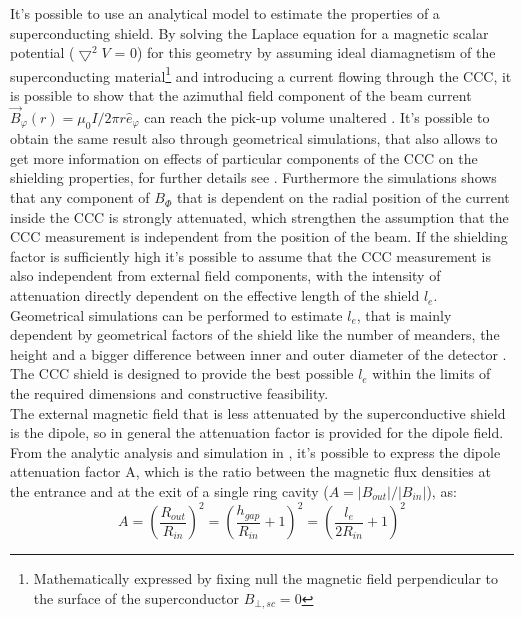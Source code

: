 \documentclass[12pt,a4paper]{report}
\begin{document}
	    It's possible to use an analytical model to estimate the properties of a superconducting shield. By solving the Laplace equation for a magnetic scalar potential ($\bigtriangledown^2V$ = 0) for this geometry by assuming ideal diamagnetism of the superconducting material\footnote{Mathematically expressed by fixing null the magnetic field perpendicular to the surface of the superconductor $B_{\bot,sc} = 0$} and introducing a current flowing through the CCC, it is possible to show that the azimuthal field component of the beam current $\overrightarrow{B}_\varphi(r)= \mu_0I/2\pi r\hat{e}_\varphi$ can reach the pick-up volume unaltered \cite{GROHMANN_CCC} \cite{GROHMANN_shield}. It's possible to obtain the same result also through geometrical simulations, that also allows to get more information on effects of particular components of the CCC on the shielding properties, for further details see \cite{DEGERSEM_shield}.
        Furthermore the simulations shows that any component of $B_\Phi$ that is dependent on the radial position of the current inside the CCC is strongly attenuated, which strengthen the assumption that the CCC measurement is independent from the position of the beam. If the shielding factor is sufficiently high it's possible to assume that the CCC measurement is also independent from external field components, with the intensity of attenuation directly dependent on the effective length of the shield $l_e$. Geometrical simulations can be performed to estimate $l_e$, that is mainly dependent by geometrical factors of the shield like the number of meanders, the height and a bigger difference between inner and outer diameter of the detector \cite{DEGERSEM_shield} \cite{Marsic_shield}. The CCC shield is designed to provide the best possible \( l_e \) within the limits of the required dimensions and constructive feasibility.\\
        The external magnetic field that is less attenuated by the superconductive shield is the dipole, so in general the attenuation factor is provided for the dipole field. From the analytic analysis and simulation in \cite{GROHMANN_shield} \cite{DEGERSEM_shield}, it's possible to express the dipole attenuation factor A, which is the ratio between the magnetic flux densities at the entrance and at the exit of a single ring cavity ($A= |B_{out}|/|B_{in}|$), as:
        \begin{equation}
        	A = \left(\frac{R_{out}}{R_{in}}\right)^2 = \left(\frac{h_{gap}}{R_{in}} + 1\right) ^2 = \left(\frac{l_e}{2R_{in}} + 1\right)^2 
        	\label{CH3_dipole_shielding_factor}
        \end{equation}
\end{document}
